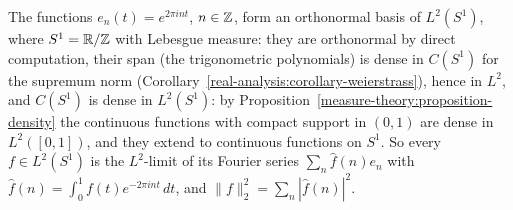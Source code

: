 \begin{example}\label{functional-analysis:example-fourier}
The functions $e_n(t) = e^{2\pi int}$, $n \in \mathbb{Z}$, form an orthonormal basis of $L^2(S^1)$, where $S^1 = \mathbb{R}/\mathbb{Z}$ with Lebesgue measure: they are orthonormal by direct computation, their span (the
trigonometric polynomials) is dense in $C(S^1)$ for the supremum norm (Corollary~\ref{real-analysis:corollary-weierstrass}), hence in $L^2$, and $C(S^1)$ is dense in $L^2(S^1)$: by
Proposition~\ref{measure-theory:proposition-density} the continuous functions with compact support in $(0, 1)$ are dense in $L^2([0, 1])$, and they extend to continuous functions on $S^1$. So every $f \in L^2(S^1)$ is the $L^2$-limit of its Fourier series $\sum_n\hat f(n)e_n$ with $\hat f(n) = \int_0^1f(t)e^{-2\pi int}\,dt$, and
$\|f\|_2^2 = \sum_n|\hat f(n)|^2$.
\end{example}

